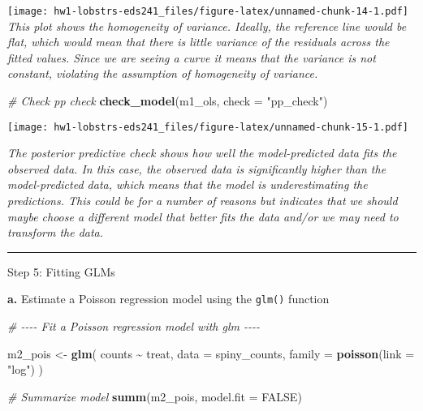 \documentclass[
]{article}
\newenvironment{Shaded}{\begin{snugshade}}{\end{snugshade}}
\newcommand{\AttributeTok}[1]{\textcolor[rgb]{0.13,0.29,0.53}{#1}}
\newcommand{\CommentTok}[1]{\textcolor[rgb]{0.56,0.35,0.01}{\textit{#1}}}
\newcommand{\ConstantTok}[1]{\textcolor[rgb]{0.56,0.35,0.01}{#1}}
\newcommand{\FunctionTok}[1]{\textcolor[rgb]{0.13,0.29,0.53}{\textbf{#1}}}
\newcommand{\NormalTok}[1]{#1}
\newcommand{\OtherTok}[1]{\textcolor[rgb]{0.56,0.35,0.01}{#1}}
\newcommand{\SpecialCharTok}[1]{\textcolor[rgb]{0.81,0.36,0.00}{\textbf{#1}}}
\newcommand{\StringTok}[1]{\textcolor[rgb]{0.31,0.60,0.02}{#1}}
\begin{document}
\texttt{[image: hw1-lobstrs-eds241\_files/figure-latex/unnamed-chunk-14-1.pdf]}
\emph{This plot shows the homogeneity of variance. Ideally, the
reference line would be flat, which would mean that there is little
variance of the residuals across the fitted values. Since we are seeing
a curve it means that the variance is not constant, violating the
assumption of homogeneity of variance.}

\begin{Shaded}
\begin{Highlighting}[]
\CommentTok{\# Check pp check}
\FunctionTok{check\_model}\NormalTok{(m1\_ols, }\AttributeTok{check =} \StringTok{"pp\_check"}\NormalTok{)}
\end{Highlighting}
\end{Shaded}

\texttt{[image: hw1-lobstrs-eds241\_files/figure-latex/unnamed-chunk-15-1.pdf]}

\emph{The posterior predictive check shows how well the model-predicted
data fits the observed data. In this case, the observed data is
significantly higher than the model-predicted data, which means that the
model is underestimating the predictions. This could be for a number of
reasons but indicates that we should maybe choose a different model that
better fits the data and/or we may need to transform the data.}

\begin{center}\rule{0.5\linewidth}{0.5pt}\end{center}

Step 5: Fitting GLMs

\textbf{a.} Estimate a Poisson regression model using the \texttt{glm()}
function

\begin{Shaded}
\begin{Highlighting}[]
\CommentTok{\# {-}{-}{-}{-} Fit a Poisson regression model with glm {-}{-}{-}{-}}

\NormalTok{m2\_pois }\OtherTok{\textless{}{-}} \FunctionTok{glm}\NormalTok{(}
\NormalTok{    counts }\SpecialCharTok{\textasciitilde{}}\NormalTok{ treat,}
    \AttributeTok{data =}\NormalTok{ spiny\_counts,}
    \AttributeTok{family =} \FunctionTok{poisson}\NormalTok{(}\AttributeTok{link =} \StringTok{"log"}\NormalTok{)}
\NormalTok{)}

\CommentTok{\# Summarize model}
\FunctionTok{summ}\NormalTok{(m2\_pois, }\AttributeTok{model.fit =} \ConstantTok{FALSE}\NormalTok{)}
\end{Highlighting}
\end{Shaded}
\end{document}
